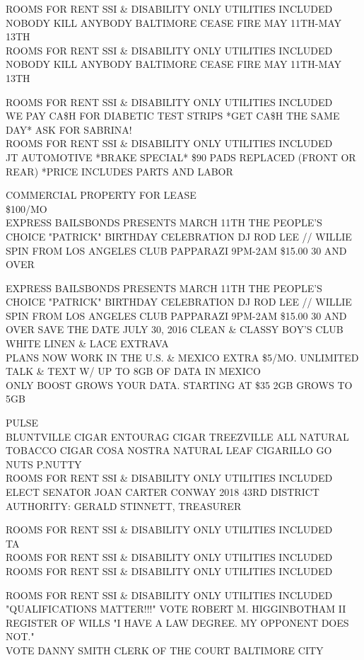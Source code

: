 \documentclass[10pt,letterpaper]{article}
\begin{document}
ROOMS FOR RENT SSI \& DISABILITY ONLY UTILITIES INCLUDED\\
NOBODY KILL ANYBODY BALTIMORE CEASE FIRE MAY 11TH{-}MAY 13TH\\
ROOMS FOR RENT SSI \& DISABILITY ONLY UTILITIES INCLUDED NOBODY KILL ANYBODY BALTIMORE CEASE FIRE MAY 11TH{-}MAY 13TH

ROOMS FOR RENT SSI \& DISABILITY ONLY UTILITIES INCLUDED\\
WE PAY CA\$H FOR DIABETIC TEST STRIPS *GET CA\$H THE SAME DAY* ASK FOR SABRINA!\\
ROOMS FOR RENT SSI \& DISABILITY ONLY UTILITIES INCLUDED\\
JT AUTOMOTIVE *BRAKE SPECIAL* \$90 PADS REPLACED (FRONT OR REAR) *PRICE INCLUDES PARTS AND LABOR

COMMERCIAL PROPERTY FOR LEASE\\
\$100/MO\\
EXPRESS BAILSBONDS PRESENTS MARCH 11TH THE PEOPLE'S CHOICE "PATRICK" BIRTHDAY CELEBRATION DJ ROD LEE // WILLIE SPIN FROM LOS ANGELES CLUB PAPPARAZI 9PM{-}2AM \$15.00 30 AND OVER

EXPRESS BAILSBONDS PRESENTS MARCH 11TH THE PEOPLE'S CHOICE "PATRICK" BIRTHDAY CELEBRATION DJ ROD LEE // WILLIE SPIN FROM LOS ANGELES CLUB PAPPARAZI 9PM{-}2AM \$15.00 30 AND OVER SAVE THE DATE JULY 30, 2016 CLEAN \& CLASSY BOY'S CLUB WHITE LINEN \& LACE EXTRAVA\\
PLANS NOW WORK IN THE U.S. \& MEXICO EXTRA \$5/MO. UNLIMITED TALK \& TEXT W/ UP TO 8GB OF DATA IN MEXICO\\
ONLY BOOST GROWS YOUR DATA.  STARTING AT \$35 2GB GROWS TO 5GB

PULSE\\
BLUNTVILLE CIGAR ENTOURAG CIGAR TREEZVILLE ALL NATURAL TOBACCO CIGAR COSA NOSTRA NATURAL LEAF CIGARILLO GO NUTS P.NUTTY\\
ROOMS FOR RENT SSI \& DISABILITY ONLY UTILITIES INCLUDED\\
ELECT SENATOR JOAN CARTER CONWAY 2018 43RD DISTRICT AUTHORITY: GERALD STINNETT, TREASURER

ROOMS FOR RENT SSI \& DISABILITY ONLY UTILITIES INCLUDED\\
TA\\
ROOMS FOR RENT SSI \& DISABILITY ONLY UTILITIES INCLUDED\\
ROOMS FOR RENT SSI \& DISABILITY ONLY UTILITIES INCLUDED

ROOMS FOR RENT SSI \& DISABILITY ONLY UTILITIES INCLUDED\\
"QUALIFICATIONS MATTER!!!" VOTE ROBERT M. HIGGINBOTHAM II REGISTER OF WILLS "I HAVE A LAW DEGREE.  MY OPPONENT DOES NOT."\\
VOTE DANNY SMITH CLERK OF THE COURT BALTIMORE CITY
\end{document}
